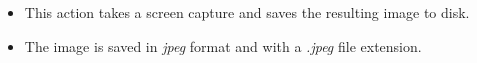 
\begin{itemize}
\item This action takes a screen capture and saves the resulting image to disk.
\item The image is saved in \emph{jpeg} format and with a \emph{.jpeg} file extension.
\end{itemize}
